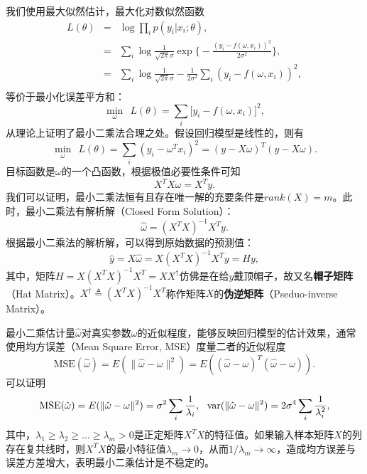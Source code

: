 我们使用最大似然估计，最大化对数似然函数
\begin{equation}
    \begin{array}{lll}
      L(\theta) & = & \log \prod\limits_i p(y_i|x_i;\theta), \\
       & = & \sum\limits_i \log \frac{1}{\sqrt{2\pi}\sigma} \exp\big\{-\frac{(y_i - f(\omega,x_i))^2}{2\sigma^2}\big\}, \\
       & = & \sum\limits_i \log \frac{1}{\sqrt{2\pi}\sigma} - \frac{1}{2\sigma^2} \sum\limits_i (y_i - f(\omega,x_i))^2, \\
    \end{array}
\end{equation}
等价于最小化误差平方和：
\[
    \min\limits_\omega~~L(\theta) = \sum\limits_i \big[y_i - f(\omega,x_i)\big]^2,
\]
从理论上证明了最小二乘法合理之处。假设回归模型是线性的，则有
\begin{equation}
    \min\limits_\omega~~L(\theta) = \sum\limits_i (y_i - \omega^T x_i)^2 = (y-X\omega)^T (y-X\omega).
\end{equation}
目标函数是$\omega$的一个凸函数，根据极值必要性条件可知
\[
    X^T X \omega = X^T y.
\]
我们可以证明，最小二乘法恒有且存在唯一解的充要条件是$\textit{rank}(X)=\textit{m}$。此时，最小二乘法有解析解（Closed Form Solution）：
\begin{equation}
    \hat \omega = (X^T X)^{-1} X^T y.
\end{equation}
根据最小二乘法的解析解，可以得到原始数据的预测值：
\begin{equation}
    \hat y = X \hat \omega = X(X^T X)^{-1} X^T y = H y,
\end{equation}
其中，矩阵$H=X(X^T X)^{-1} X^T=XX^\dag$仿佛是在给$y$戴顶帽子，故又名\textbf{帽子矩阵}（Hat Matrix）。$X^\dag\triangleq(X^T X)^{-1} X^T$称作矩阵$X$的\textbf{伪逆矩阵}（Pseduo-inverse Matrix）。

最小二乘估计量$\hat \omega$对真实参数$\omega$的近似程度，能够反映回归模型的估计效果，通常使用均方误差（Mean Square Error, MSE）度量二者的近似程度
\begin{equation}
    \text{MSE}(\hat \omega) = E(\|\hat \omega - \omega\|^2) = E((\hat \omega - \omega)^T (\hat \omega - \omega)).
\end{equation}
可以证明
\begin{equation}
    \text{MSE}(\hat \omega) = E(\|\hat \omega - \omega\|^2) = \sigma^2 \sum\limits_i \frac{1}{\lambda_i},~~
    \operatorname{\mathrm{var}}(\|\hat \omega - \omega\|^2) = 2\sigma^4 \sum\limits_i \frac{1}{\lambda_i^2},
\end{equation}
其中，$\lambda_1\ge \lambda_2\ge \ldots\ge \lambda_m>0$是正定矩阵$X^T X$的特征值。如果输入样本矩阵$X$的列存在复共线时，则$X^T X$的最小特征值$\lambda_m\rightarrow 0$，从而$1/\lambda_m \rightarrow \infty$，造成均方误差与误差方差增大，表明最小二乘估计是不稳定的。

